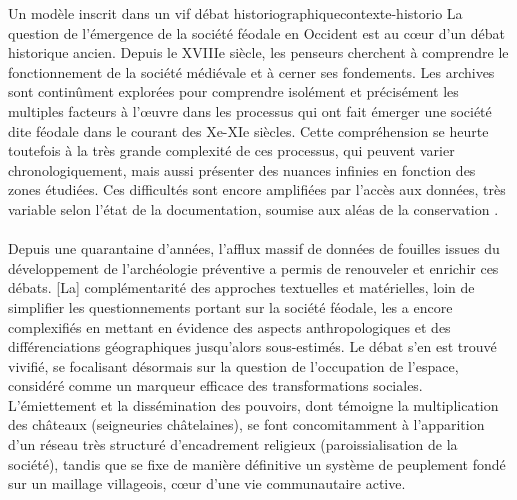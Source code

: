 \medskip 
\begin{encadre}{Un modèle inscrit dans un vif débat historiographique}{contexte-historio}
\renewcommand{\thempfootnote}{\alph{mpfootnote}}	
\noindent \og
La question de l'émergence de la société féodale en Occident est au cœur d'un débat historique ancien.
Depuis le XVIIIe siècle, les penseurs cherchent à comprendre le fonctionnement de la société médiévale et à cerner ses fondements.
Les archives sont continûment explorées pour comprendre isolément et précisément les multiples facteurs à l'œuvre dans les processus qui ont fait émerger une société dite \og féodale\fg{} dans le courant des Xe-XIe siècles.
Cette compréhension se heurte toutefois à la très grande complexité de ces processus, qui peuvent varier chronologiquement, mais aussi présenter des nuances infinies en fonction des zones étudiées.
Ces difficultés sont encore amplifiées par l'accès aux données, très variable selon l'état de la documentation, soumise aux aléas de la conservation \textelp{}.
\paragraph[espace]{}
\noindent Depuis une quarantaine d'années, l'afflux massif de données de fouilles issues du développement de l'archéologie préventive a permis de renouveler et enrichir ces débats\textelp{}.
[La] complémentarité des approches textuelles et matérielles, loin de simplifier les questionnements portant sur la société féodale, les a encore complexifiés en mettant en évidence des aspects anthropologiques et des différenciations géographiques jusqu'alors sous-estimés.
Le débat s'en est trouvé vivifié, se focalisant désormais sur la question de l'occupation de l'espace, considéré comme un marqueur efficace des transformations sociales.
L'émiettement et la dissémination des pouvoirs, dont témoigne la multiplication des châteaux (seigneuries châtelaines), se font concomitamment à l'apparition d'un réseau très structuré d'encadrement religieux (paroissialisation de la société), tandis que se fixe de manière définitive un système de peuplement fondé sur un maillage villageois, cœur d'une vie communautaire active.


\end{encadre}
